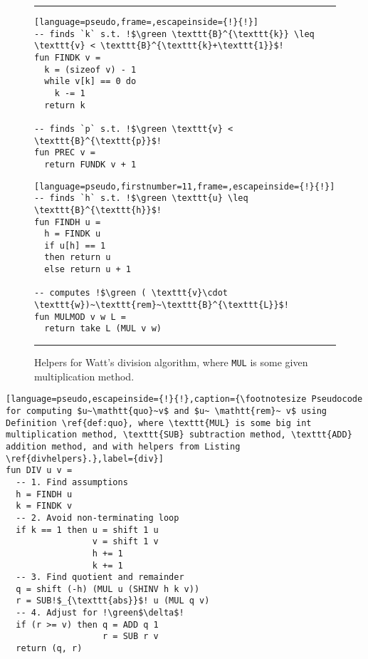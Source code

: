 \begin{figure}
{
\hrule\vspace*{-0.4ex}
\begin{minipage}{.45\textwidth}
\begin{lstlisting}[language=pseudo,frame=,escapeinside={!}{!}]
-- finds `k` s.t. !$\green \texttt{B}^{\texttt{k}} \leq \texttt{v} < \texttt{B}^{\texttt{k}+\texttt{1}}$!
fun FINDK v =
  k = (sizeof v) - 1
  while v[k] == 0 do
    k -= 1
  return k

-- finds `p` s.t. !$\green \texttt{v} < \texttt{B}^{\texttt{p}}$!
fun PREC v =
  return FUNDK v + 1
\end{lstlisting}
\end{minipage}\hfill
\begin{minipage}{.45\textwidth}
\begin{lstlisting}[language=pseudo,firstnumber=11,frame=,escapeinside={!}{!}]
-- finds `h` s.t. !$\green \texttt{u} \leq \texttt{B}^{\texttt{h}}$!
fun FINDH u =
  h = FINDK u
  if u[h] == 1
  then return u
  else return u + 1

-- computes !$\green ( \texttt{v}\cdot \texttt{w})~\texttt{rem}~\texttt{B}^{\texttt{L}}$!
fun MULMOD v w L =
  return take L (MUL v w)
\end{lstlisting}
\end{minipage}\vspace*{-0.8ex}
\hrule
}
\caption{\footnotesize Helpers for Watt's division algorithm, where \texttt{MUL} is some given multiplication method.}
\label{divhelpers}
\end{figure}

\begin{lstlisting}[language=pseudo,escapeinside={!}{!},caption={\footnotesize Pseudocode for computing $u~\mathtt{quo}~v$ and $u~ \mathtt{rem}~ v$ using Definition \ref{def:quo}, where \texttt{MUL} is some big int multiplication method, \texttt{SUB} subtraction method, \texttt{ADD} addition method, and with helpers from Listing \ref{divhelpers}.},label={div}]
fun DIV u v =
  -- 1. Find assumptions
  h = FINDH u
  k = FINDK v
  -- 2. Avoid non-terminating loop
  if k == 1 then u = shift 1 u
                 v = shift 1 v
                 h += 1
                 k += 1
  -- 3. Find quotient and remainder
  q = shift (-h) (MUL u (SHINV h k v))
  r = SUB!$_{\texttt{abs}}$! u (MUL q v)
  -- 4. Adjust for !\green$\delta$!
  if (r >= v) then q = ADD q 1
                   r = SUB r v
  return (q, r)
\end{lstlisting}

